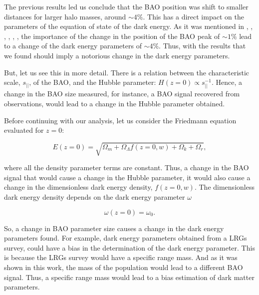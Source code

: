 The previous results led us conclude that the BAO position was shift to smaller distances
for larger halo masses, around $\sim 4\%$. This has a direct impact on the parameters of the 
equation of state of the dark energy. As it was mentioned in \cite{motion}, \cite{uno}, \cite{dos}, \cite{tres}, \cite{cuatro}, \cite{crocce}, the importance of the change in the position of the 
BAO peak of $\sim 1\%$ lead to a change of the dark energy parameters of $\sim 4\%$. Thus, with 
the results that we found should imply a notorious change in the dark energy parameters. 

But, let us see this in more detail. There is a relation between the characteristic scale, $s_{||}$, of the BAO, and the Hubble parameter: $H(z=0) \propto s_{||}^{-1} $. 
Hence, a change in the BAO size measured, for instance, a BAO signal recovered from observations,
would lead to a change in the Hubble parameter obtained.

Before continuing with our analysis, let us consider the Friedmann equation evaluated for $z=0$:

\[ E(z=0) = \sqrt{\Omega_m+\Omega_{\Lambda}f(z=0,w)+\Omega_k+  \Omega_r},\]


where all the density parameter terms are constant. Thus, a change in the BAO signal that would cause a change in the Hubble parameter, it would also cause a change in the dimensionless dark energy density, $f(z=0,w)$.  The dimensionless dark energy density depends on the  dark energy parameter $\omega$

\[ \omega(z=0) = \omega_0.\]

So, a change in BAO parameter size causes a change in the dark energy parameters found.
For example, dark energy parameters obtained from a LRGs survey, could have a bias in the determination of the dark energy parameter. This is because the LRGs survey would have a specific range mass. 
And as it was shown in this work, the mass of the population would lead to a different BAO signal.
Thus, a specific range mass would lead to a bias estimation of dark matter parameters. 
